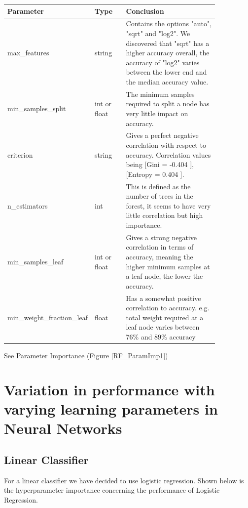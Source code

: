 \documentclass[11pt]{article}
\begin{document}
\begin{table}[ht]
  \centering
  \begin{tabular}{|p{0.25\linewidth} | p{0.15 \linewidth} | p{0.45\linewidth}|} 
    \hline
    \textbf{Parameter}  & \textbf{Type} & \textbf{Conclusion} \\ \hline
    max\_features & string & Contains the options "auto", "sqrt" and "log2". We discovered that "sqrt" has a higher accuracy overall, the accuracy of "log2" varies between the lower end and the median accuracy value.\\ \hline
    min\_samples\_split & int or float & The minimum samples required to split a node has very little impact on accuracy.  \\ \hline
    criterion & string & Gives a perfect negative correlation with respect to accuracy. Correlation values being [Gini = -0.404 ], [Entropy = 0.404 ]. \\ \hline
    n\_estimators & int & This is defined as the number of trees in the forest, it seems to have very little correlation but high importance. \\ \hline
    min\_samples\_leaf & int or float & Gives a strong negative correlation in terms of accuracy, meaning the higher minimum samples at a leaf node, the lower the accuracy. \\ \hline
    min\_weight\_fraction\_leaf & float & Has a somewhat positive correlation to accuracy. e.g. total weight required at a leaf node varies between 76\% and 89\% accuracy\\ \hline
  \end{tabular}
\end{table}\label{RF_Analysis_Table}
See Parameter Importance (Figure \ref{RF_ParamImp1})

\newpage
\section{Variation in performance with varying learning parameters in Neural Networks}
\subsection{Linear Classifier}
\cite{SklearnLinearModel}

For a linear classifier we have decided to use logistic regression. 
Shown below is the hyperparameter importance concerning the performance of Logistic Regression.
\end{document}
